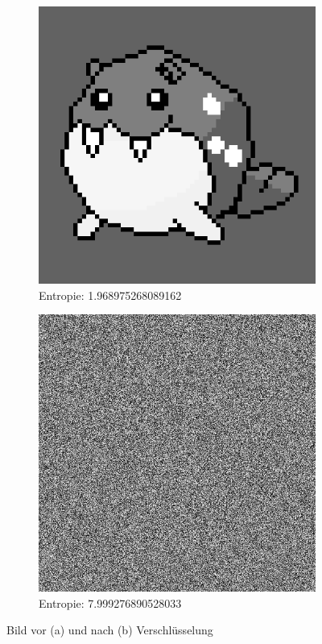 \begin{figure}
	\centering

	\begin{subfigure}{0.35\textwidth}
		\includegraphics[width=\textwidth]{../1/3/gray_1.968975268089162_spheal.png}
		\caption{Entropie: 1.968975268089162}
	\end{subfigure}
	\hfill
	\begin{subfigure}{0.35\textwidth}
		\includegraphics[width=\textwidth]{../1/3/encrypted_7.999276890528033_spheal.png}
		\caption{Entropie: 7.999276890528033}
	\end{subfigure}

	\caption{Bild vor (a) und nach (b) Verschlüsselung}
	\label{fig:spheal}
\end{figure}

